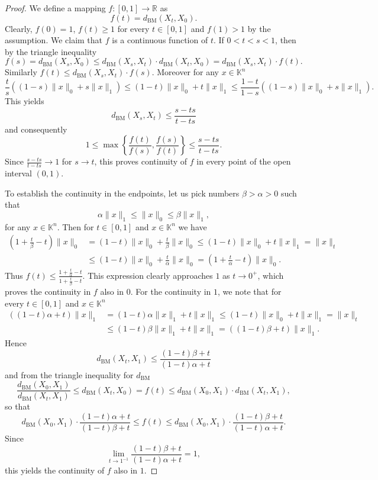\documentclass[12pt, reqno]{amsart}
\theoremstyle{definition}
\theoremstyle{remark}
\numberwithin{equation}{section}
\newcommand\dbm{d_{\mathrm{BM}}}
\begin{document}
\begin{proof}

We define a mapping $f:[0, 1] \to \mathbb{R}$ as
$$f(t) = \dbm(X_t, X_0).$$
Clearly, $f(0)=1$, $f(t) \geq 1$ for every $t \in [0, 1]$ and $f(1)>1$ by the assumption. We claim that $f$ is a continuous function of $t$. If $0 < t < s < 1$, then by the triangle inequality
$$f(s) = \dbm(X_s, X_0) \leq \dbm(X_s, X_t) \cdot \dbm(X_t, X_0) = \dbm(X_s, X_t) \cdot f(t).$$
Similarly $f(t) \leq \dbm(X_s, X_t) \cdot f(s)$. Moreover for any $x \in \mathbb{K}^n$
$$\frac{t}{s} \left( (1-s)\|x\|_0 + s\|x\|_1  \right ) \leq (1-t)\|x\|_0 + t \|x\|_1 \leq \frac{1-t}{1-s} \left ((1-s)\|x\|_0 + s \|x\|_1 \right ).$$
This yields
$$\dbm(X_s, X_t) \leq \frac{s-ts}{t-ts}$$
and consequently
$$1 \leq \max \left \{ \frac{f(t)}{f(s)}, \frac{f(s)}{f(t)} \right \} \leq \frac{s-ts}{t-ts}.$$
Since $\frac{s-ts}{t-ts} \to 1$ for $s \to t$, this proves continuity of $f$ in every point of the open interval $(0, 1)$.


To establish the continuity in the endpoints, let us pick numbers $\beta > \alpha >0$ such that 
$$\alpha \|x\|_1 \leq \|x\|_0 \leq \beta\|x\|_1,$$
for any $x \in \mathbb{K}^n$. Then for $t \in [0, 1]$ and $x \in \mathbb{K}^n$ we have
\begin{align*}
\left ( 1 + \frac{t}{\beta} - t \right ) \|x\|_0 &=  (1-t) \|x\|_0 + \frac{t}{\beta} \|x\|_0 \leq (1-t) \|x\|_0 + t \|x\|_1 = \|x\|_t \\
 &\leq (1-t) \|x\|_0 + \frac{t}{\alpha} \|x\|_0 = \left ( 1 + \frac{t}{\alpha} - t \right ) \|x\|_0.
\end{align*}
Thus $f(t) \leq \frac{ 1 + \frac{t}{\alpha} - t}{1 + \frac{t}{\beta} - t}$. This expression clearly approaches $1$ as $t \to 0^{+}$, which proves the continuity in $f$ also in $0$. For the continuity in $1$, we note that for every $t \in [0, 1]$ and $x \in \mathbb{K}^n$
\begin{align*}
\left ((1-t)\alpha + t \right ) \|x\|_1  &= (1-t)\alpha \|x\|_1 + t \|x\|_1 \leq (1-t)\|x\|_0 + t\|x\|_1 = \|x\|_t \\
&\leq (1-t) \beta \|x\|_1 + t \|x\|_1 = ((1-t)\beta + t) \|x\|_1.
\end{align*}
Hence
$$\dbm(X_t, X_1) \leq \frac{(1-t)\beta + t}{(1-t)\alpha + t}$$
and from the triangle inequality for $\dbm$
$$\frac{\dbm(X_0, X_1)}{\dbm(X_t, X_1)} \leq \dbm(X_t, X_0) = f(t) \leq \dbm(X_0, X_1) \cdot \dbm(X_t, X_1),$$
so that
$$\dbm(X_0, X_1) \cdot \frac{(1-t)\alpha + t}{(1-t)\beta + t} \leq f(t) \leq \dbm(X_0, X_1) \cdot \frac{(1-t)\beta + t}{(1-t)\alpha + t}.$$
Since 
$$\lim_{t \to 1^{-1}} \frac{(1-t)\beta + t}{(1-t)\alpha + t} = 1, $$
this yields the continuity of $f$ also in $1$.


\end{proof}
\end{document}
